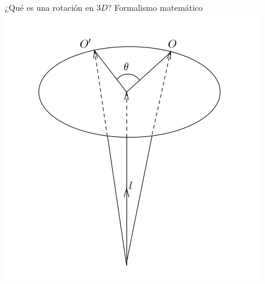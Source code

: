 \documentclass[10pt]{beamer}
\def\R{\mathbb{R}}
\begin{document}
\begin{frame}{¿Qué es una rotación en $3D$? Formalismo matemático}
	\includegraphics[scale=0.6]{rotation.png}
	
	
\end{frame}
\end{document}
